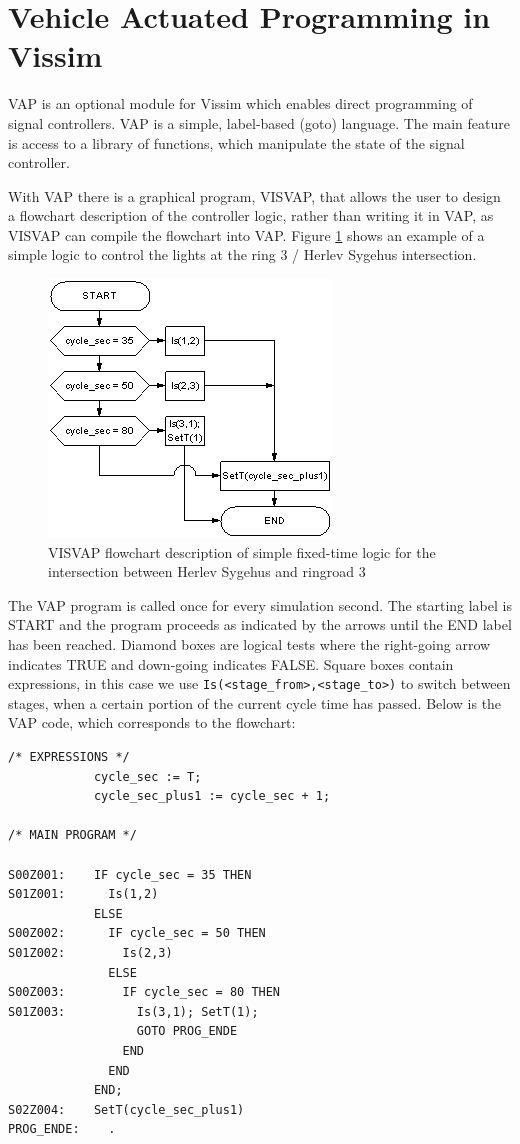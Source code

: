\section{Vehicle Actuated Programming in Vissim}
\label{vap}
VAP is an optional module for Vissim which enables direct programming of signal controllers. VAP is a simple, label-based (goto) language. The main feature is access to a library of functions, which manipulate the state of the signal controller. 

With VAP there is a graphical program, VISVAP, that allows the user to design a flowchart description of the controller logic, rather than writing it in VAP, as VISVAP can compile the flowchart into VAP. Figure \ref{fig:visvap_example} shows an example of a simple logic to control the lights at the ring 3 / Herlev Sygehus intersection.

\begin{figure}[htbp]
\centering
\includegraphics[scale=0.5]{visvap_example_herlev-sygehus.png} 
\caption{VISVAP flowchart description of simple fixed-time logic for the intersection between Herlev Sygehus and ringroad 3}
\label{fig:visvap_example}
\end{figure}

The VAP program is called once for every simulation second. The starting label is START and the program proceeds as indicated by the arrows until the END label has been reached. Diamond boxes are logical tests where the right-going arrow indicates TRUE and down-going indicates FALSE. Square boxes contain expressions, in this case we use \verb|Is(<stage_from>,<stage_to>)| to switch between stages, when a certain portion of the current cycle time has passed. Below is the VAP code, which corresponds to the flowchart:

\begin{verbatim}
/* EXPRESSIONS */ 
            cycle_sec := T;
            cycle_sec_plus1 := cycle_sec + 1;

/* MAIN PROGRAM */ 

S00Z001:    IF cycle_sec = 35 THEN
S01Z001:      Is(1,2)
            ELSE
S00Z002:      IF cycle_sec = 50 THEN
S01Z002:        Is(2,3)
              ELSE
S00Z003:        IF cycle_sec = 80 THEN
S01Z003:          Is(3,1); SetT(1);
                  GOTO PROG_ENDE
                END
              END
            END;
S02Z004:    SetT(cycle_sec_plus1)
PROG_ENDE:    .
\end{verbatim}


